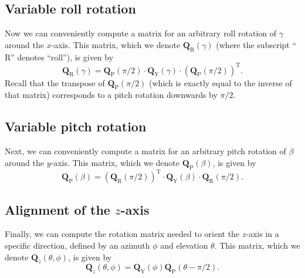 \subsection{Variable roll rotation}
Now we can conveniently compute a matrix for an arbitrary roll rotation of $\gamma$ around the $x$-axis.
This matrix, which we denote $\mathbf{Q}_\text{R}(\gamma)$ (where the subscript ``$\text{R}$'' denotes ``roll''), is given by %
\begin{equation}
\mathbf{Q}_\text{R}(\gamma) = \mathbf{Q}_\text{P}(\pi/2) \cdot \mathbf{Q}_\text{Y}(\gamma) \cdot \left( \mathbf{Q}_\text{P}(\pi/2) \right)^\text{T}.
\end{equation} %
Recall that the transpose of $\mathbf{Q}_\text{P}(\pi/2)$ (which is exactly equal to the inverse of that matrix) corresponds to a pitch rotation downwards by $\pi/2$.

\subsection{Variable pitch rotation}
Next, we can conveniently compute a matrix for an arbitrary pitch rotation of $\beta$ around the $y$-axis.
This matrix, which we denote $\mathbf{Q}_\text{P}(\beta)$, is given by %
\begin{equation}
\mathbf{Q}_\text{P}(\beta) = \left( \mathbf{Q}_\text{R}(\pi/2) \right)^\text{T} \cdot \mathbf{Q}_\text{Y}(\beta) \cdot \mathbf{Q}_\text{R}(\pi/2).
\end{equation} %

\subsection{Alignment of the \texorpdfstring{$z$}{z}-axis}
Finally, we can compute the rotation matrix needed to orient the $z$-axis in a specific direction, defined by an azimuth $\phi$ and elevation $\theta$.
This matrix, which we denote $\mathbf{Q}_z(\theta,\phi)$, is given by %
\begin{equation}\label{eq:A1_Navigation_Filters:z_Rotation}
\mathbf{Q}_z(\theta,\phi) = \mathbf{Q}_\text{Y}(\phi) \mathbf{Q}_\text{P}(\theta - \pi/2).
\end{equation} %